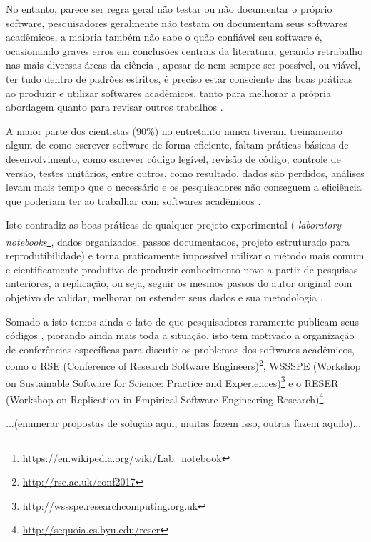 No entanto, parece ser regra geral não testar ou não documentar o próprio
software, pesquisadores geralmente não testam ou documentam seus softwares
acadêmicos, a maioria também não sabe o quão confiável seu software é,
ocasionando graves erros em conclusões centrais da literatura,
gerando retrabalho nas mais diversas áreas da ciência \cite{Merali2010Computational},
apesar de nem sempre ser possível, ou viável, ter tudo dentro de
padrões estritos, é preciso estar consciente das boas práticas ao
produzir e utilizar softwares acadêmicos, tanto para melhorar a própria
abordagem quanto para revisar outros trabalhos \cite{wilson2014best}.

A maior parte dos cientistas (90\%) no entretanto nunca tiveram treinamento
algum de como escrever software de forma eficiente, faltam práticas básicas de
desenvolvimento, como escrever código legível, revisão de código, controle de
versão, testes unitários, entre outros, como resultado, dados são perdidos,
análises levam mais tempo que o necessário e os pesquisadores não conseguem a
eficiência que poderiam ter ao trabalhar com softwares acadêmicos
\cite{wilson2017good}.

Isto contradiz as boas práticas de qualquer projeto experimental ({\it
laboratory
notebooks}\footnote{\url{https://en.wikipedia.org/wiki/Lab_notebook}}, dados
organizados, passos documentados, projeto estruturado para reprodutibilidade) e
torna praticamente impossível utilizar o método mais comum e cientificamente
produtivo de produzir conhecimento novo a partir de pesquisas anteriores, a
replicação, ou seja, seguir os mesmos passos do autor original com objetivo de
validar, melhorar ou estender seus dados e sua metodologia
\cite{king1995replication, Stodden2010}.

Somado a isto temos ainda o fato de que pesquisadores raramente publicam seus
códigos \cite{robles2010replicating, amann2015software}, piorando ainda mais toda a situação, isto tem motivado a organização
de conferências específicas para discutir os problemas dos softwares
acadêmicos, como o RSE (Conference of Research Software Engineers)\footnote{
\url{http://rse.ac.uk/conf2017}}, WSSSPE (Workshop on Sustainable Software for
Science: Practice and Experiences)\footnote{
\url{http://wssspe.researchcomputing.org.uk}} e o RESER (Workshop on
Replication in Empirical Software Engineering Research)\footnote{
\url{http://sequoia.cs.byu.edu/reser}}.

...(enumerar propostas de solução aqui, muitas fazem isso, outras fazem aquilo)...

